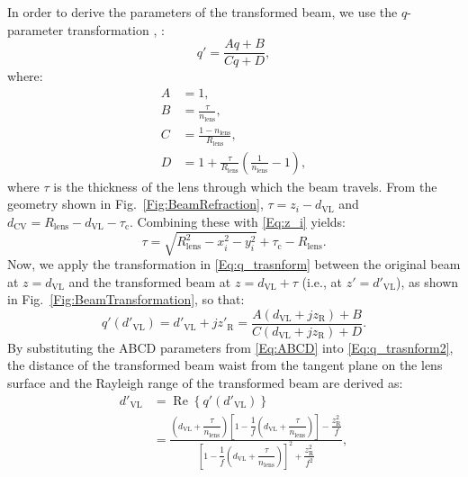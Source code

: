 \documentclass[lettersize,journal]{IEEEtran}
\begin{document}
In order to derive the parameters of the transformed beam, we use the $q$-parameter transformation \cite[p.~97]{Saleh2019}, \cite{Nemoto1990}:
%
\begin{equation}
    q' = \frac{Aq+B}{Cq+D} ,
    \label{Eq:q_trasnform}
\end{equation}
%
where:
%
\begin{subequations}
\begin{align}
A &= 1, \\ 
B &= \frac{\tau}{n_\mathrm{lens}}, \\
C &= \frac{1-n_\mathrm{lens}}{R_\mathrm{lens}}, \\
D &= 1+\frac{\tau}{R_\mathrm{lens}}\left(\frac{1}{n_\mathrm{lens}}-1\right),
\end{align}
\label{Eq:ABCD}%
\end{subequations}
%
where $\tau$ is the thickness of the lens through which the beam travels. From the geometry shown in Fig.~\ref{Fig:BeamRefraction}, $\tau=z_i-d_\mathrm{VL}$ and $d_\mathrm{CV}=R_\mathrm{lens}-d_\mathrm{VL}-\tau_\mathrm{c}$. Combining these with \eqref{Eq:z_i} yields:
\begin{equation}
\tau = \sqrt{R_\mathrm{lens}^2-x_i^2 - y_i^2} + \tau_\mathrm{c} - R_\mathrm{lens}.
\end{equation}
Now, we apply the transformation in \eqref{Eq:q_trasnform} between the original beam at $z = d_\mathrm{VL}$ and the transformed beam at $z = d_\mathrm{VL} +\tau$ (i.e., at $z' = d'_\mathrm{VL}$), as shown in Fig.~\ref{Fig:BeamTransformation}, so that:
%
\begin{equation}
    q'(d'_\mathrm{VL}) = d'_\mathrm{VL} + jz'_\mathrm{R} = \frac{A(d_\mathrm{VL}+jz_\mathrm{R})+B}{C(d_\mathrm{VL}+jz_\mathrm{R})+D}.
    \label{Eq:q_trasnform2}
\end{equation}
%
By substituting the ABCD parameters from \eqref{Eq:ABCD} into \eqref{Eq:q_trasnform2}, the distance of the transformed beam waist from the tangent plane on the lens surface and the Rayleigh range of the transformed beam are derived as:
%
\begin{equation} \label{Eq:d2_transformed}
    \begin{aligned}
    d'_\mathrm{VL} &= \operatorname{Re}\left\{q'(d'_\mathrm{VL})\right\} \\
    &= \frac{\left(d_\mathrm{VL}+\dfrac{\tau}{n_\mathrm{lens}}\right)\left[1-\dfrac{1}{f}\left(d_\mathrm{VL}+\dfrac{\tau}{n_\mathrm{lens}}\right)\right]-\dfrac{z_\mathrm{R}^2}{f}}{\left[1-\dfrac{1}{f}\left(d_\mathrm{VL}+\dfrac{\tau}{n_\mathrm{lens}}\right)\right]^2+\dfrac{z_\mathrm{R}^2}{f^2}},
    \end{aligned}
\end{equation}
\end{document}

